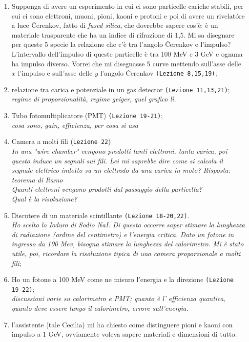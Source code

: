 \documentclass[../main.tex]{subfiles}
\begin{document}
\begin{enumerate}
    \item Supponga di avere un esperimento in cui ci sono particelle cariche stabili, per cui ci sono elettroni, muoni, pioni, kaoni e protoni e poi di avere un rivelatóre a luce Čerenkov, fatto di \textit{fused silica}, che dovrebbe sapere cos'è: è un materiale trasparente che ha un indice di rifrazione di 1,5. Mi sa disegnare per queste 5 specie la relazione che c'è tra l'angolo Čerenkov e l'impulso? L'intervallo dell'impulso di queste particelle è tra 100 MeV e 3 GeV e ognuna ha impulso diverso. Vorrei che mi disegnasse 5 curve mettendo sull'asse delle $x$ l'impulso e sull'asse delle $y$ l'angolo Čerenkov \texttt{(Lezione 8,15,19)}; 
    \item relazione tra carica e potenziale in un gas detector \texttt{(Lezione 11,13,21)};\\
    \textit{regime di proporzionalità, regime geiger, quel grafico lì.}
    \item Tubo fotomultiplicatore (PMT) \texttt{(Lezione 19-21)};\\
    \textit{cosa sono, gain, efficienza, per cosa si usa}
    \item Camera a molti fili (\texttt{Lezione 22})\\
    \textit{In una "wire chamber" vengono prodotti tanti elettroni, tanta carica, poi questo induce un segnali sui fili. Lei mi saprebbe dire come si calcola il segnale elettrico indotto su un elettrodo da una carica in moto? Risposta: teorema di Ramo\\
    Quanti elettroni vengono prodotti dal passaggio della particella?\\
    Qual è la risoluzione?}
    \item Discutere di un materiale scintillante \texttt{(Lezione 18-20,22)}.\\ {\it Ho scelto lo Ioduro di Sodio NaI. Di questo occorre saper stimare la lunghezza di radiazione (ordine del centimetro) e l'energia critica. Dato un fotone in ingresso da 100 Mev, bisogna stimare la lunghezza del calorimetro. Mi è stato utile, poi, ricordare la risoluzione tipica di una camera proporzionale a molti fili};
    \item Ho un fotone a 100 MeV come ne misuro l'energia e la direzione \texttt{(Lezione 19-22)};\\
    \textit{discussioni varie su calorimetro e PMT; quanto è l' efficienza quantica, quanto deve essere lungo il calorimetro, errore sull'energia.}
    \item l'assistente (tale Cecilia) mi ha chiesto come distinguere pioni e kaoni con impulso a 1 GeV, ovviamente voleva sapere materiali e dimensioni di tutto.

\end{enumerate}
\end{document}
